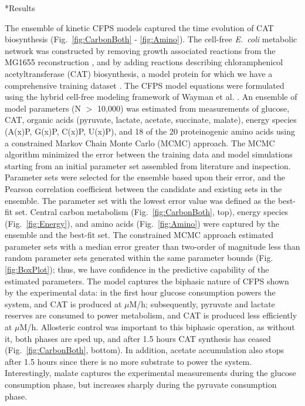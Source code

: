 \documentclass[12pt]{article}
\makeatletter
\renewcommand\section{\@startsection
	{subsection}{2}{0mm}
	{-0.2in}
	{0.05\baselineskip}
	{\normalfont\large\bfseries}}
\makeatother
\begin{document}
\clearpage

\section*{Results}

The ensemble of kinetic CFPS models captured the time evolution of CAT biosynthesis (Fig.~\ref{fig:CarbonBoth} - \ref{fig:Amino}).
The cell-free \textit{E.~coli} metabolic network was constructed by removing growth associated reactions from the MG1655 reconstruction \cite{Feist121},
and by adding reactions describing chloramphenicol acetyltransferase (CAT) biosynthesis, a model protein for which we have a comprehensive training dataset \cite{2005_calhoun_BiotechnologyProgress}.
The CFPS model equations were formulated using the hybrid cell-free modeling framework of Wayman et al. \cite{pr3010138}.
An ensemble of model parameters (N $>$ 10,000) was estimated from measurements of glucose, CAT, organic acids (pyruvate, lactate, acetate, succinate, malate), energy species (A(x)P, G(x)P, C(x)P, U(x)P), and 18 of the 20 proteinogenic amino acids using a constrained Markov Chain Monte Carlo (MCMC) approach.
The MCMC algorithm minimized the error between the training data and model simulations starting from an initial parameter set assembled from literature and inspection.
Parameter sets were selected for the ensemble based upon their error, and the Pearson correlation coefficient between the candidate and existing sets in the ensemble.
The parameter set with the lowest error value was defined as the best-fit set.
Central carbon metabolism (Fig.~\ref{fig:CarbonBoth}, top), energy species (Fig.~\ref{fig:Energy}), and amino acids (Fig.~\ref{fig:Amino}) were captured by the ensemble and the best-fit set.
The constrained MCMC approach estimated parameter sets with a median error greater than two-order of magnitude less than random parameter sets generated within
the same parameter bounds (Fig. \ref{fig:BoxPlot}); thus, we have confidence in the predictive capability of the estimated parameters.
The model captures the biphasic nature of CFPS shown by the experimental data: in the first hour glucose consumption powers the system, and CAT is produced at  $\mu$M/h; subsequently, pyruvate and lactate reserves are consumed to power metabolism, and CAT is produced less efficiently at  $\mu$M/h.
Allosteric control was important to this biphasic operation, as without it, both phases are sped up, and after 1.5 hours CAT synthesis has ceased (Fig.~\ref{fig:CarbonBoth}, bottom).
In addition, acetate accumulation also stops after 1.5 hours since there is no more substrate to power the system.
Interestingly, malate captures the experimental measurements during the glucose consumption phase, but increases sharply during the pyruvate consumption phase. 
\end{document}

